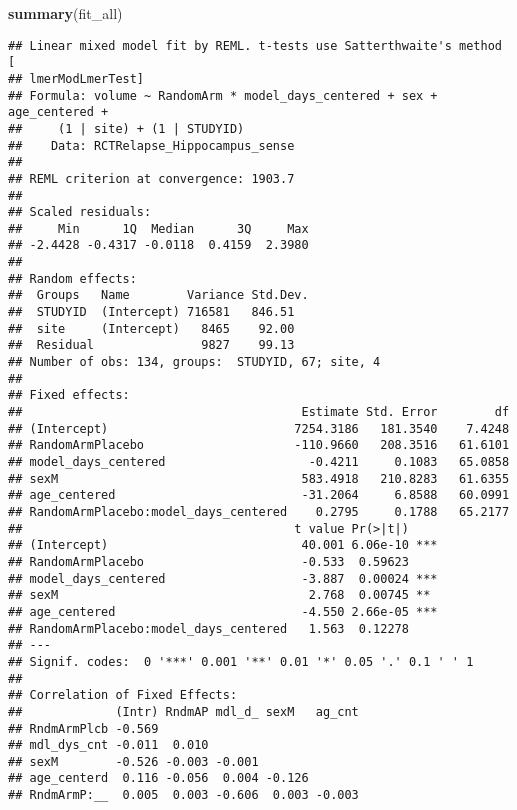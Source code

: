 \documentclass[]{article}
\newenvironment{Shaded}{\begin{snugshade}}{\end{snugshade}}
\newcommand{\KeywordTok}[1]{\textcolor[rgb]{0.13,0.29,0.53}{\textbf{#1}}}
\newcommand{\NormalTok}[1]{#1}
\theoremstyle{definition}
\theoremstyle{definition}
\theoremstyle{definition}
\theoremstyle{remark}
\begin{document}
\begin{Shaded}
\begin{Highlighting}[]
  \KeywordTok{summary}\NormalTok{(fit_all)}
\end{Highlighting}
\end{Shaded}

\begin{verbatim}
## Linear mixed model fit by REML. t-tests use Satterthwaite's method [
## lmerModLmerTest]
## Formula: volume ~ RandomArm * model_days_centered + sex + age_centered +  
##     (1 | site) + (1 | STUDYID)
##    Data: RCTRelapse_Hippocampus_sense
## 
## REML criterion at convergence: 1903.7
## 
## Scaled residuals: 
##     Min      1Q  Median      3Q     Max 
## -2.4428 -0.4317 -0.0118  0.4159  2.3980 
## 
## Random effects:
##  Groups   Name        Variance Std.Dev.
##  STUDYID  (Intercept) 716581   846.51  
##  site     (Intercept)   8465    92.00  
##  Residual               9827    99.13  
## Number of obs: 134, groups:  STUDYID, 67; site, 4
## 
## Fixed effects:
##                                       Estimate Std. Error        df
## (Intercept)                          7254.3186   181.3540    7.4248
## RandomArmPlacebo                     -110.9660   208.3516   61.6101
## model_days_centered                    -0.4211     0.1083   65.0858
## sexM                                  583.4918   210.8283   61.6355
## age_centered                          -31.2064     6.8588   60.0991
## RandomArmPlacebo:model_days_centered    0.2795     0.1788   65.2177
##                                      t value Pr(>|t|)    
## (Intercept)                           40.001 6.06e-10 ***
## RandomArmPlacebo                      -0.533  0.59623    
## model_days_centered                   -3.887  0.00024 ***
## sexM                                   2.768  0.00745 ** 
## age_centered                          -4.550 2.66e-05 ***
## RandomArmPlacebo:model_days_centered   1.563  0.12278    
## ---
## Signif. codes:  0 '***' 0.001 '**' 0.01 '*' 0.05 '.' 0.1 ' ' 1
## 
## Correlation of Fixed Effects:
##             (Intr) RndmAP mdl_d_ sexM   ag_cnt
## RndmArmPlcb -0.569                            
## mdl_dys_cnt -0.011  0.010                     
## sexM        -0.526 -0.003 -0.001              
## age_centerd  0.116 -0.056  0.004 -0.126       
## RndmArmP:__  0.005  0.003 -0.606  0.003 -0.003
\end{verbatim}
\end{document}
